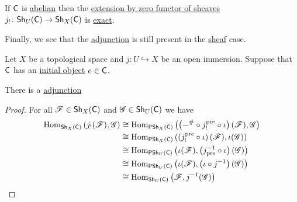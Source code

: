 \documentclass[../../main]{subfiles}
\begin{document}
\begin{corollary}\label{cor:extension-by-zero-sheaf-exact}
  If \(\mathsf{C}\) is \hyperref[def:abelian-category]{abelian} then the \hyperref[def:extension-by-zero-sheaf]{extension by zero functor of sheaves} \(j_{!}\colon \mathsf{Sh}_{U}(\mathsf{C}) \to \mathsf{Sh}_{X}(\mathsf{C})\) is \hyperref[def:exact-functor]{exact}.
\end{corollary}

Finally, we see that the \hyperref[def:adjoint-functors]{adjunction} is still present in the \hyperref[def:sheaf]{sheaf} case.
\begin{theorem}\label{thm:open-immersion-adjunction-sheaf}
  Let \(X\) be a topological space and \(j\colon U \hookrightarrow X\) be an open immersion.
  Suppose that \(\mathsf{C}\) has an \hyperref[def:initial-terminal-object]{initial object} \(e \in \mathsf{C}\).

  There is a \hyperref[def:adjoint-functors]{adjunction}
  \begin{center}
  \end{center}
\end{theorem}
\begin{proof}
  For all \(\mathscr{F} \in \mathsf{Sh}_{X}(\mathsf{C})\) and \(\mathscr{G} \in \mathsf{Sh}_{U}(\mathsf{C})\) we have
  \begin{align*}
    \operatorname{Hom}_{\mathsf{Sh}_{X}(\mathsf{C})} \left( j_{!}(\mathscr{F}), \mathscr{G} \right) &\cong \operatorname{Hom}_{\mathsf{PSh}_{X}(\mathsf{C})} \left( \left( -^{\#} \circ j_{!}^{\operatorname*{pre}} \circ \iota \right)(\mathscr{F}), \mathscr{G} \right) \\
                                                                            &\cong \operatorname{Hom}_{\mathsf{PSh}_{X}(\mathsf{C})} \left( \left( j_{!}^{\operatorname*{pre}} \circ \iota \right)(\mathscr{F}), \iota(\mathscr{G}) \right) \\
                                                                            &\cong \operatorname{Hom}_{\mathsf{PSh}_{U}(\mathsf{C})} \left( \iota(\mathscr{F}), \left( j_{\operatorname*{pre}}^{-1} \circ \iota \right)(\mathscr{G}) \right) \\
                                                                            &\cong \operatorname{Hom}_{\mathsf{PSh}_{U}(\mathsf{C})} \left( \iota(\mathscr{F}), \left( \iota \circ j^{-1} \right)(\mathscr{G}) \right) \\
                                                                            &\cong \operatorname{Hom}_{\mathsf{Sh}_{U}(\mathsf{C})} \left( \mathscr{F}, j^{-1}(\mathscr{G}) \right) \qedhere
  \end{align*}
\end{proof}
\end{document}
